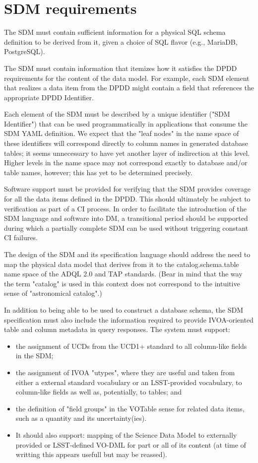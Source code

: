 

\section{SDM requirements}\label{sec:sdm}
The SDM must contain sufficient information for a physical SQL schema definition to be derived from it, given a choice of SQL flavor (e.g., MariaDB, PostgreSQL).

The SDM must contain information that itemizes how it satisfies the DPDD requirements for the content of the data model.  For example, each SDM element that realizes a data item from the DPDD might contain a field that references the appropriate DPDD Identifier.

Each element of the SDM must be described by a unique identifier ("SDM Identifier") that can be used programmatically in applications that consume the SDM YAML definition.  We expect that the "leaf nodes" in the name space of these identifiers will correspond directly to column names in generated database tables; it seems unnecessary to have yet another layer of indirection at this level.  Higher levels in the name space may not correspond exactly to database and/or table names, however; this has yet to be determined precisely.

Software support must be provided for verifying that the SDM provides coverage for all the data items defined in the DPDD.  This should ultimately be subject to verification as part of a CI process.  In order to facilitate the introduction of the SDM language and software into DM, a transitional period should be supported during which a partially complete SDM can be used without triggering constant CI failures.

The design of the SDM and its specification language should address the need to map the physical data model that derives from it to the catalog.schema.table name space of the ADQL 2.0 and TAP standards.  (Bear in mind that the way the term "catalog" is used in this context does not correspond to the intuitive sense of "astronomical catalog".)

In addition to being able to be used to construct a database schema, the SDM specification must also include the information required to provide IVOA-oriented table and column metadata in query responses.  The system must support:

\begin{itemize}
\item      the assignment of UCDs from the UCD1+ standard to all column-like fields in the SDM;
    \item the assignment of IVOA "utypes", where they are useful and taken from either a external standard vocabulary or an LSST-provided vocabulary, to column-like fields as well as, potentially, to tables; and
    \item the definition of "field groups" in the VOTable sense for related data items, such as a quantity and its uncertainty(ies).
\item It should also support:
    mapping of the Science Data Model to externally provided or LSST-defined VO-DML for part or all of its content (at time of writting this appears usefull but may be reassed).
\end{itemize}

